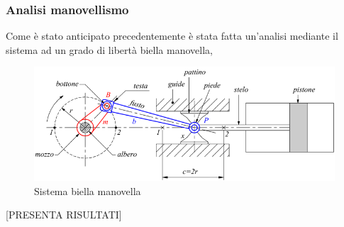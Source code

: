 \subsubsection*{Analisi manovellismo}
Come è stato anticipato precedentemente è stata fatta un'analisi mediante il sistema ad un grado di libertà biella manovella, 
\begin{figure}[ht]
	\begin{center}
		\includegraphics[scale=0.6]{Immagini/Sperimentale/BiellaManovella}
		\caption{Sistema biella manovella}
		\label{fig:BiellaManovella}
	\end{center}
\end{figure}
[PRESENTA RISULTATI]
